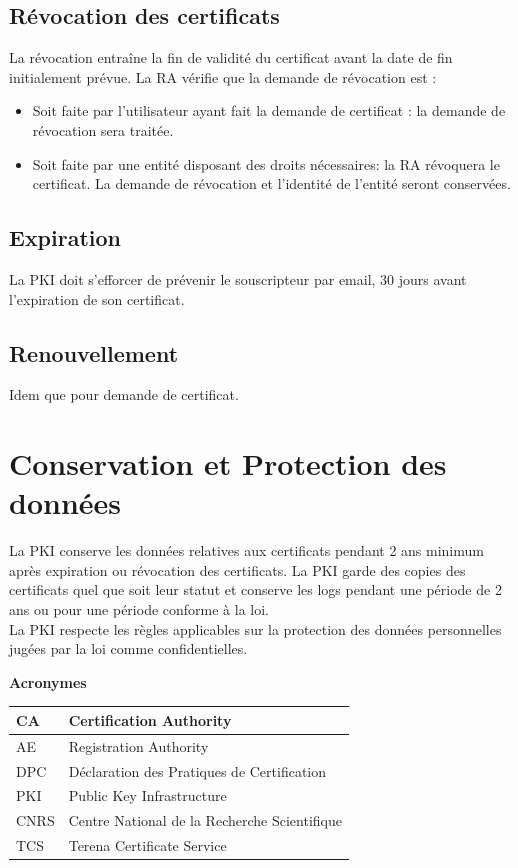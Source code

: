 \documentclass[a4paper,11pt,french]{book}
\begin{document}
\subsection{Révocation des certificats}
La révocation entraîne la fin de validité du certificat avant la date de fin initialement prévue. La RA vérifie que la demande de révocation est :
\begin{itemize}
\item Soit faite par l'utilisateur ayant fait la demande de certificat :  la demande de révocation sera traitée.
\item Soit faite par une entité disposant des droits nécessaires: la RA révoquera le certificat. La demande de révocation et l'identité de l'entité seront conservées.
\end{itemize}

\subsection{Expiration}
La PKI doit s'efforcer de prévenir le souscripteur par email, 30 jours avant l'expiration de son certificat.

\subsection{Renouvellement}
Idem que pour demande de certificat.

\section{Conservation et Protection des données}
La PKI conserve les données relatives aux certificats pendant 2 ans minimum après expiration ou révocation des certificats. La PKI garde des copies des certificats quel que soit leur statut et conserve les logs pendant une période de 2 ans ou pour une période conforme à la loi. 
\\La PKI respecte les règles applicables sur la protection des données personnelles jugées par la loi comme confidentielles.


\newpage
\textbf {Acronymes}


\begin{tabular}{|l|p{10cm}|}

\hline
CA & Certification Authority
\\
\hline
AE  & Registration Authority 
\\

\hline
DPC & Déclaration des Pratiques de Certification
\\
\hline
PKI & Public Key Infrastructure
\\
\hline
CNRS & Centre National de la Recherche Scientifique
\\
\hline
TCS & Terena Certificate Service
\\
\hline
\end{tabular}
\end{document}
